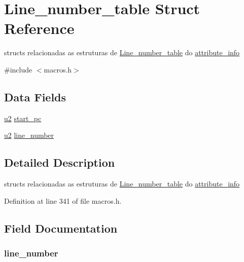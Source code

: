 \hypertarget{struct_line__number__table}{}\section{Line\+\_\+number\+\_\+table Struct Reference}
\label{struct_line__number__table}


structs relacionadas as estruturas de \hyperlink{struct_line__number__table}{Line\+\_\+number\+\_\+table} do \hyperlink{structattribute__info}{attribute\+\_\+info}  




{\ttfamily \#include $<$macros.\+h$>$}

\subsection*{Data Fields}
\begin{DoxyCompactItemize}
\item 
\hyperlink{macros_8h_aa76d8c8015643c6a837661a10142016e}{u2} \hyperlink{struct_line__number__table_a3ded0b47a89e0816c20dc577a82a1cd5}{start\+\_\+pc}
\item 
\hyperlink{macros_8h_aa76d8c8015643c6a837661a10142016e}{u2} \hyperlink{struct_line__number__table_a04c031f26dbcf868c823d68ad0771dbc}{line\+\_\+number}
\end{DoxyCompactItemize}


\subsection{Detailed Description}
structs relacionadas as estruturas de \hyperlink{struct_line__number__table}{Line\+\_\+number\+\_\+table} do \hyperlink{structattribute__info}{attribute\+\_\+info} 

Definition at line 341 of file macros.\+h.



\subsection{Field Documentation}
\hypertarget{struct_line__number__table_a04c031f26dbcf868c823d68ad0771dbc}{}
\subsubsection[{line\+\_\+number}]{ line\+\_\+number}\label{struct_line__number__table_a04c031f26dbcf868c823d68ad0771dbc}



